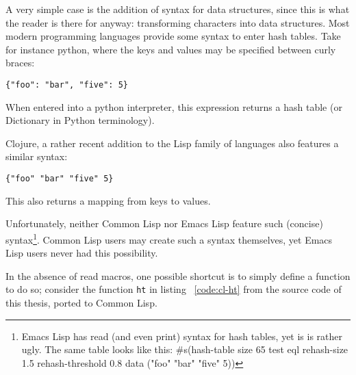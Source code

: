 \documentclass[a4paper,10pt,twoside]{report}
\newcommand{\el}{Emacs Lisp}
\newcommand{\cl}{Common Lisp}
\newcommand{\fun}[1]{\texttt{#1}}
\begin{document}
A very simple case is the addition of syntax for data structures, since this is
what the reader is there for anyway: transforming characters into data
structures.  Most modern programming languages provide some syntax to enter hash
tables.  Take for instance python, where the keys and values may be specified
between curly braces:


\begin{lstlisting}[style=pythoncode]
{"foo": "bar", "five": 5}
\end{lstlisting}

When entered into a python interpreter, this expression returns a hash table (or
Dictionary in Python terminology).

Clojure, a rather recent addition to the Lisp family of languages also features
a similar syntax:


\begin{lstlisting}[style=lispinline]
{"foo" "bar" "five" 5}
\end{lstlisting}

This also returns a mapping from keys to values.

Unfortunately, neither \cl{} nor \el{} feature such (concise)
syntax\footnote{\el{} has read (and even print) syntax for hash tables, yet is
  is rather ugly.  The same table looks like this: \#s(hash-table size 65 test
  eql rehash-size 1.5 rehash-threshold 0.8 data ("foo" "bar" "five" 5))}.  \cl{}
users may create such a syntax themselves, yet \el{} users never had this
possibility.

In the absence of read macros, one possible shortcut is to simply define a
function to do so; consider the function \fun{ht} in listing ~\ref{code:cl-ht}
from the source code of this thesis, ported to \cl{}.


\end{document}
